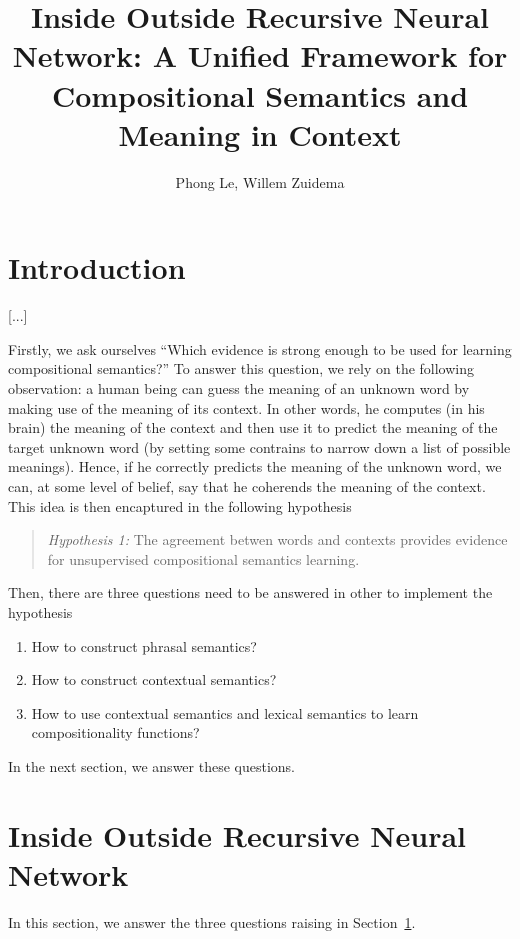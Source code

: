 \documentclass[11pt]{article}
\title{Inside Outside Recursive Neural Network: A Unified Framework for 
Compositional Semantics and Meaning in Context}
\author{Phong Le, Willem Zuidema}
\begin{document}
\maketitle


\section{Introduction}
\label{section introduction}

[...]

Firstly, we ask ourselves ``Which evidence is strong enough to be used for 
learning compositional semantics?'' To answer this question, we rely on the 
following observation: a human being can guess the meaning of an unknown 
word by making use of the meaning of its context. In other words, he computes 
(in his brain) the meaning of the context and then use it to predict the meaning 
of the target unknown word (by setting some contrains to narrow down a list of 
possible meanings). Hence, if he correctly predicts the meaning of the unknown word, 
we can, at some level of belief, say that he coherends the meaning of the context. 
This idea is then encaptured in the following hypothesis
\begin{quote}
\textit{Hypothesis 1:} The agreement betwen words and contexts provides evidence for unsupervised 
compositional semantics learning. 
\end{quote}

Then, there are three questions need to be answered in other to implement the 
hypothesis
\begin{enumerate}
	\item How to construct phrasal semantics?
	\item How to construct contextual semantics?
	\item How to use contextual semantics and lexical semantics to learn 
	compositionality functions?
\end{enumerate}
In the next section, we answer these questions.


\section{Inside Outside Recursive Neural Network}
\label{section iornn}

In this section, we answer the three questions raising in Section~\ref{section introduction}.
\end{document}
